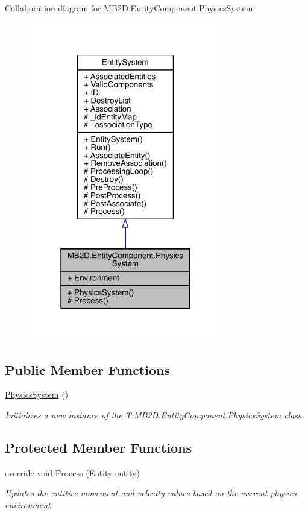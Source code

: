 Collaboration diagram for M\+B2\+D.\+Entity\+Component.\+Physics\+System\+:\nopagebreak
\begin{figure}[H]
\begin{center}
\leavevmode
\includegraphics[width=241pt]{class_m_b2_d_1_1_entity_component_1_1_physics_system__coll__graph}
\end{center}
\end{figure}
\subsection*{Public Member Functions}
\begin{DoxyCompactItemize}
\item 
\hyperlink{class_m_b2_d_1_1_entity_component_1_1_physics_system_a3ab72aac19449619200d2353572b28b0}{Physics\+System} ()
\begin{DoxyCompactList}\small\item\em Initializes a new instance of the T\+:\+M\+B2\+D.\+Entity\+Component.\+Physics\+System class. \end{DoxyCompactList}\end{DoxyCompactItemize}
\subsection*{Protected Member Functions}
\begin{DoxyCompactItemize}
\item 
override void \hyperlink{class_m_b2_d_1_1_entity_component_1_1_physics_system_ab8398d3b16f49e684f55649877f645c0}{Process} (\hyperlink{class_m_b2_d_1_1_entity_component_1_1_entity}{Entity} entity)
\begin{DoxyCompactList}\small\item\em Updates the entities movement and velocity values based on the current physics environment \end{DoxyCompactList}\end{DoxyCompactItemize}
